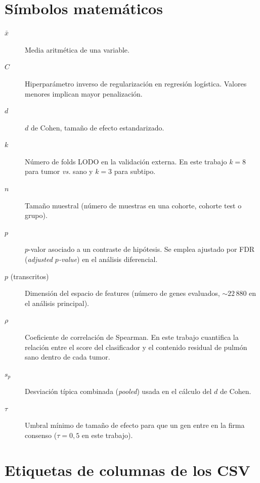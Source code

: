\section*{Símbolos matemáticos}
{}

\begin{description}
  \item[$\bar{x}$] Media aritmética de una variable.
  \item[$C$] Hiperparámetro inverso de regularización en regresión
  logística. Valores menores implican mayor penalización.
  \item[$d$] $d$ de Cohen, tamaño de efecto estandarizado.
  \item[$k$] Número de folds LODO en la validación externa. En este
  trabajo $k=8$ para tumor \emph{vs.} sano y $k=3$ para subtipo.
  \item[$n$] Tamaño muestral (número de muestras en una cohorte, cohorte
  test o grupo).
  \item[$p$] $p$-valor asociado a un contraste de hipótesis. Se emplea
  ajustado por FDR (\emph{adjusted $p$-value}) en el análisis
  diferencial.
  \item[$p$ (transcritos)] Dimensión del espacio de features (número de
  genes evaluados, $\sim 22\,880$ en el análisis principal).
  \item[$\rho$] Coeficiente de correlación de Spearman. En este trabajo
  cuantifica la relación entre el score del clasificador y el contenido
  residual de pulmón sano dentro de cada tumor.
  \item[$s_p$] Desviación típica combinada (\emph{pooled}) usada en el
  cálculo del $d$ de Cohen.
  \item[$\tau$] Umbral mínimo de tamaño de efecto para que un gen entre
  en la firma consenso ($\tau = 0{,}5$ en este trabajo).
\end{description}

\section*{Etiquetas de columnas de los CSV}
{}

